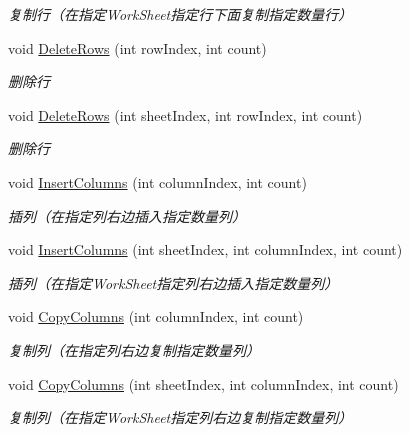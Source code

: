 \begin{DoxyCompactItemize}
\begin{DoxyCompactList}\small\item\em 复制行（在指定\-Work\-Sheet指定行下面复制指定数量行） \end{DoxyCompactList}\item 
void \hyperlink{class_x_c_l_net_tools_1_1_office_1_1_excel_handler_1_1_excel_helper_a04ebe281303c12b0bba570dfc1fb72b5}{Delete\-Rows} (int row\-Index, int count)
\begin{DoxyCompactList}\small\item\em 删除行 \end{DoxyCompactList}\item 
void \hyperlink{class_x_c_l_net_tools_1_1_office_1_1_excel_handler_1_1_excel_helper_a7018591050a42c4e7cfa2d63a76bd519}{Delete\-Rows} (int sheet\-Index, int row\-Index, int count)
\begin{DoxyCompactList}\small\item\em 删除行 \end{DoxyCompactList}\item 
void \hyperlink{class_x_c_l_net_tools_1_1_office_1_1_excel_handler_1_1_excel_helper_acaa208b7a203148f775abaf3bf2e4a06}{Insert\-Columns} (int column\-Index, int count)
\begin{DoxyCompactList}\small\item\em 插列（在指定列右边插入指定数量列） \end{DoxyCompactList}\item 
void \hyperlink{class_x_c_l_net_tools_1_1_office_1_1_excel_handler_1_1_excel_helper_abd72f2dee77fe7ba5e035dac8ef2bc3f}{Insert\-Columns} (int sheet\-Index, int column\-Index, int count)
\begin{DoxyCompactList}\small\item\em 插列（在指定\-Work\-Sheet指定列右边插入指定数量列） \end{DoxyCompactList}\item 
void \hyperlink{class_x_c_l_net_tools_1_1_office_1_1_excel_handler_1_1_excel_helper_a8755580f71c387120cc4e84260ac22dc}{Copy\-Columns} (int column\-Index, int count)
\begin{DoxyCompactList}\small\item\em 复制列（在指定列右边复制指定数量列） \end{DoxyCompactList}\item 
void \hyperlink{class_x_c_l_net_tools_1_1_office_1_1_excel_handler_1_1_excel_helper_a1bc9267c12dd24363a9de2c39550c761}{Copy\-Columns} (int sheet\-Index, int column\-Index, int count)
\begin{DoxyCompactList}\small\item\em 复制列（在指定\-Work\-Sheet指定列右边复制指定数量列） \end{DoxyCompactList}\item 

\end{DoxyCompactItemize}

